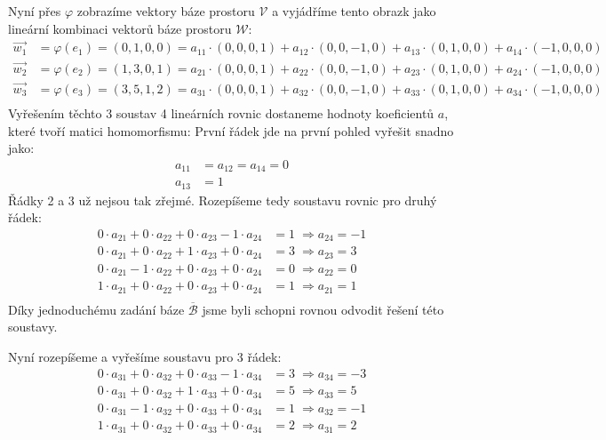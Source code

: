 \begin{example}
    Nyní přes $\varphi$ zobrazíme vektory báze prostoru $\mathcal{V}$ a vyjádříme tento
    obrazk jako lineární kombinaci vektorů báze prostoru $\mathcal{W}$:
    \begin{align*}
        \vec{w_1} & = \varphi(e_1) = (0, 1, 0, 0) =
            a_{11} \cdot (0, 0, 0, 1) + a_{12} \cdot (0, 0, -1, 0) + a_{13} \cdot (0, 1, 0, 0) + a_{14} \cdot (-1, 0, 0, 0)\\
        \vec{w_2} & = \varphi(e_2) = (1, 3, 0, 1) =
            a_{21} \cdot (0, 0, 0, 1) + a_{22} \cdot (0, 0, -1, 0) + a_{23} \cdot (0, 1, 0, 0) + a_{24} \cdot (-1, 0, 0, 0)\\
        \vec{w_3} & = \varphi(e_3) = (3, 5, 1, 2) =
            a_{31} \cdot (0, 0, 0, 1) + a_{32} \cdot (0, 0, -1, 0) + a_{33} \cdot (0, 1, 0, 0) + a_{34} \cdot (-1, 0, 0, 0)\\
    \end{align*}
    Vyřešením těchto 3 soustav 4 lineárních rovnic dostaneme hodnoty koeficientů $a$, které tvoří
    matici homomorfismu:
    První řádek jde na první pohled vyřešit snadno jako:
    \begin{align*}
        a_{11} &= a_{12} = a_{14} = 0\\
        a_{13} &= 1
    \end{align*}
    Řádky 2 a 3 už nejsou tak zřejmé. Rozepíšeme tedy soustavu rovnic pro druhý řádek:
    \begin{align*}
        0\cdot a_{21} + 0\cdot a_{22} + 0\cdot a_{23} -1 \cdot a_{24} &= 1\; \Rightarrow a_{24} = -1\\
        0\cdot a_{21} + 0\cdot a_{22} + 1\cdot a_{23} +0 \cdot a_{24} &= 3\; \Rightarrow a_{23} = 3\\
        0\cdot a_{21} - 1 \cdot a_{22} + 0\cdot a_{23} +0 \cdot a_{24} &= 0 \; \Rightarrow a_{22} = 0\\
        1\cdot a_{21} + 0 \cdot a_{22} + 0\cdot a_{23} +0 \cdot a_{24} &= 1 \; \Rightarrow a_{21} = 1\\
    \end{align*}
    Díky jednoduchému zadání báze $\overline{\mathcal{B}}$ jsme byli schopni rovnou odvodit
    řešení této soustavy.

    Nyní rozepíšeme a vyřešíme soustavu pro 3 řádek:
    \begin{align*}
        0\cdot a_{31} + 0\cdot a_{32} + 0\cdot a_{33} -1 \cdot a_{34} &= 3\; \Rightarrow a_{34} = -3\\
        0\cdot a_{31} + 0\cdot a_{32} + 1\cdot a_{33} +0 \cdot a_{34} &= 5\; \Rightarrow a_{33} = 5\\
        0\cdot a_{31} - 1 \cdot a_{32} + 0\cdot a_{33} +0 \cdot a_{34} &= 1 \; \Rightarrow a_{32} = -1\\
        1\cdot a_{31} + 0 \cdot a_{32} + 0\cdot a_{33} +0 \cdot a_{34} &= 2 \; \Rightarrow a_{31} = 2\\
    \end{align*}


\end{example}
